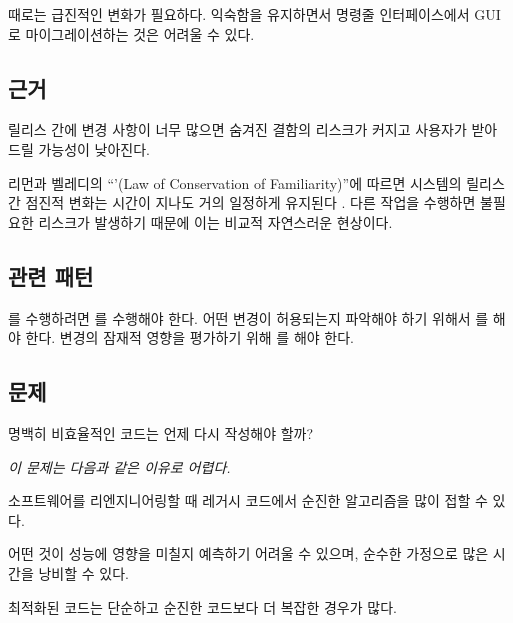 \documentclass[a4paper,10pt,twoside]{book}
\begin{document}
\begin{bulletlist}
\item 때로는 급진적인 변화가 필요하다. 익숙함을 유지하면서 명령줄 인터페이스에서 GUI로 마이그레이션하는 것은 어려울 수 있다.
\end{bulletlist}

\subsection*{근거}

릴리스 간에 변경 사항이 너무 많으면 숨겨진 결함의 리스크가 커지고 사용자가 받아 드릴 가능성이 낮아진다. 

리먼과 벨레디의 ``'(Law of Conservation of Familiarity)''에 따르면 시스템의 릴리스 간 점진적 변화는 시간이 지나도 거의 일정하게 유지된다 \cite{Lehm85a}. 다른 작업을 수행하면 불필요한 리스크가 발생하기 때문에 이는 비교적 자연스러운 현상이다.

\subsection*{관련 패턴}

를 수행하려면 를 수행해야 한다. 어떤 변경이 허용되는지 파악해야 하기 위해서 를 해야 한다. 변경의 잠재적 영향을 평가하기 위해 를 해야 한다.



\subsection*{문제}

명백히 비효율적인 코드는 언제 다시 작성해야 할까?

\emph{이 문제는 다음과 같은 이유로 어렵다.}

\begin{bulletlist}
\item 소프트웨어를 리엔지니어링할 때 레거시 코드에서 순진한 알고리즘을 많이 접할 수 있다.

\item 어떤 것이 성능에 영향을 미칠지 예측하기 어려울 수 있으며, 순수한 가정으로 많은 시간을 낭비할 수 있다.

\item 최적화된 코드는 단순하고 순진한 코드보다 더 복잡한 경우가 많다.
\end{bulletlist}
\end{document}
